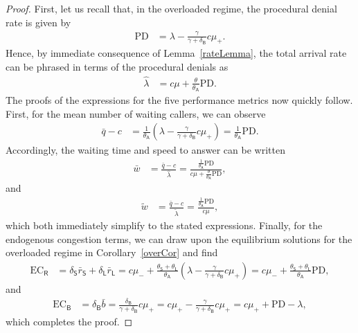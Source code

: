 \documentclass[10pt,a4paper]{amsart}
\begin{document}
\begin{proof}
First, let us recall that, in the overloaded regime, the procedural denial rate is given by
\begin{align}
\mathrm{PD}
&=
\lambda - \frac{\gamma}{\gamma + \delta_\mathsf{B}} c\mu_+
.
\end{align}
Hence, by immediate consequence of Lemma~\ref{rateLemma}, the total arrival rate can be phrased in terms of the procedural denials as
\begin{align}
\hat \lambda 
&=
c\mu + \frac{\theta}{\theta_\mathsf{A}} \mathrm{PD}
.
\end{align}
The proofs of the expressions for the five performance metrics now quickly follow. First, for the mean number of waiting callers, we can observe
\begin{align}
\bar q - c
&=
\frac{1}{\theta_\mathsf{A}}
\left(
\lambda - \frac{\gamma}{\gamma + \delta_\mathsf{B}}c\mu_+
\right)
=
\frac{1}{\theta_\mathsf{A}}\mathrm{PD}
.
\end{align}
Accordingly, the waiting time and speed to answer can be written
\begin{align}
\bar w 
&=
\frac{\bar q - c}{\hat \lambda}
=
\frac{\frac{1}{\theta_\mathsf{A}}\mathrm{PD}}
{c\mu + \frac{\theta}{\theta_\mathsf{A}}\mathrm{PD}}
,
\end{align}
and
\begin{align}
\tilde w
&=
\frac{\bar q - c}{\tilde \lambda}
=
\frac{\frac{1}{\theta_\mathsf{A}}\mathrm{PD}}{c\mu}
,
\end{align}
which both immediately simplify to the stated expressions. 
Finally, for the endogenous congestion terms, we can draw upon the equilibrium solutions for the overloaded regime in Corollary~\ref{overCor} and find
\begin{align}
\mathrm{EC}_\mathsf{R}
&=
\delta_\mathsf{S}\bar r_\mathsf{S} + \delta_\mathsf{L}\bar r_\mathsf{L}
=
c\mu_-
+ 
\frac{\theta_\mathsf{S} + \theta_\mathsf{L}}{\theta_\mathsf{A}}\left( \lambda - \frac{\gamma}{\gamma + \delta_\mathsf{B}}c\mu_+\right)
=
c\mu_-
+ 
\frac{\theta_\mathsf{S} + \theta_\mathsf{L}}{\theta_\mathsf{A}}
\mathrm{PD}
,
\end{align}
and
\begin{align}
\mathrm{EC}_\mathsf{B}
&=
\delta_\mathsf{B}\bar b
=
\frac{\delta_\mathsf{B}}{\gamma + \delta_\mathsf{B}} c\mu_+
=
c\mu_+
-
\frac{\gamma}{\gamma + \delta_\mathsf{B}}
c\mu_+
=
c\mu_+
+
\mathrm{PD}
-
\lambda
,
\end{align}
which completes the proof.
\end{proof}
\end{document}
